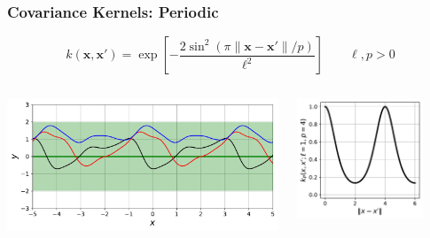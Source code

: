 \documentclass{beamer}
\newcommand{\vect}[1]{\boldsymbol{#1}}
\providecommand{\norm}[1]{\lVert#1\rVert}
\begin{document}
	\begin{frame}
		\frametitle{Covariance Kernels: Periodic}
		\begin{equation*}
			k(\vect{x},\vect{x}')=\exp\left[-\frac{2\sin^2\left(\pi\norm{\vect{x}-\vect{x}'}/p\right)}{\ell^2}\right]\qquad\ell,p>0
		\end{equation*}
		\begin{columns}
			\begin{column}{0.6\textwidth}
				\includegraphics[width=\textwidth]{figures/03b_periodic_sample.pdf}
			\end{column}
			\hfill
			\begin{column}{0.4\textwidth}
				\begin{center}
					\includegraphics[width=0.8\textwidth]{figures/03b_periodic.pdf}
				\end{center}
			\end{column}
		\end{columns}
	\end{frame}
\end{document}
